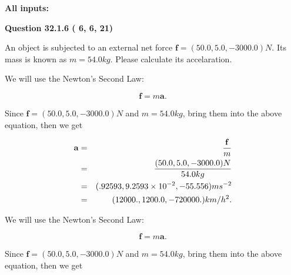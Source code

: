 \documentclass[12pt]{article}
\begin{document}
   
   
   
\noindent{}
   
   
   
   
\noindent\vspace{0.1in}\hspace{-0.08in} {\textbf{\Large{All inputs: }}}
   
   
  
\vspace{0.2in}
  
{\textbf{\Large{Question
32.1.6 
 (          6,          6,         21)
}}}
  
  
 
An object is subjected to an external net force $\mathbf{f}=(
50.0,  %
5.0,
-3000.0  )N$. Its mass is known as
$m= %
54.0 kg$. Please calculate its accelaration.
 
 
 
 
\noindent{}
 
 

We will use the Newton's Second Law:
 
\[
\mathbf{f}=m\mathbf{a}.
\]
 
Since $\mathbf{f}=( %
50.0,  %
5.0,  %
-3000.0 )N$
and $m= %
54.0 kg$, bring them into the above equation, then we get
 
\begin{eqnarray*}
\mathbf{a}&=&\frac{\mathbf{f}}m  \\
&=&\frac{(
50.0 ,
5.0 ,
-3000.0 )N
}{ %
54.0 kg}  \\
&=&(
.92593 ,
9.2593 \times 10^{-2},
-55.556
)ms^{-2} \\
&=&(
12000. ,
1200.0 ,
-720000.
)km/h^2.
\end{eqnarray*}
 
 
 
\noindent{}
 
 

 
 
 
\noindent{}
 
 

We will use the Newton's Second Law:
 
\[
\mathbf{f}=m\mathbf{a}.
\]
 
Since $\mathbf{f}=( %
50.0,  %
5.0,  %
-3000.0 )N$
and $m= %
54.0 kg$, bring them into the above equation, then we get
 
\end{document}
